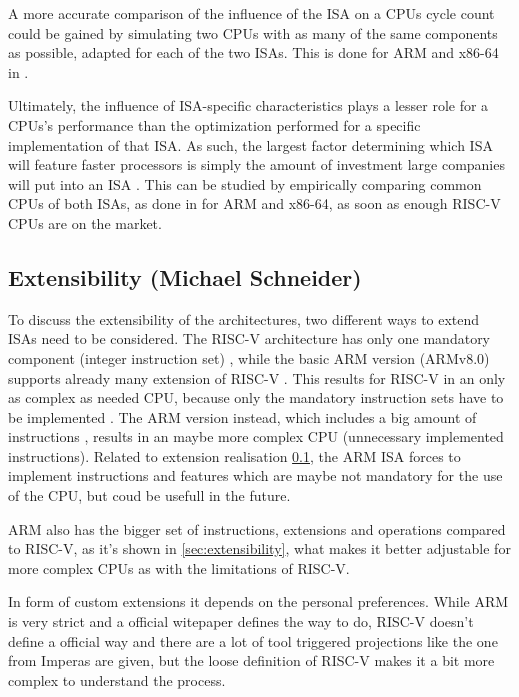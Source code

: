 \documentclass[conference]{IEEEtran}
\begin{document}
	A more accurate comparison of the influence of the \gls{ISA} on a \gls{CPU}s cycle count could be gained
	by simulating two \glspl{CPU} with as many of the same components as possible, adapted for each of the two \glspl{ISA}.
	This is done for ARM and x86-64 in \cite{Akram2017}.

	Ultimately, the influence of \gls{ISA}-specific characteristics plays a lesser role for a \glspl{CPU}'s performance
	than the optimization performed for a specific implementation of that \gls{ISA}.
	As such, the largest factor determining which \gls{ISA} will feature faster processors is simply the amount of investment
	large companies will put into an \gls{ISA} \cite{Blem2013}.
	This can be studied by empirically comparing common \glspl{CPU} of both \glspl{ISA}, as done in \cite{Blem2013} for ARM and
	x86-64, as soon as enough RISC-V \glspl{CPU} are on the market.
	
	\subsection{Extensibility (Michael Schneider)} \label{dis:Extensibility}
	To discuss the extensibility of the architectures, two different ways to extend \glspl{ISA} need to be considered. The RISC-V architecture has only one mandatory component (integer instruction set) \cite{Waterman2017}, while the basic ARM version (ARMv8.0) supports already many extension of RISC-V \cite{Arm2020}. 
	This results for RISC-V in an only as complex as needed CPU, because only the mandatory instruction sets have to be implemented \cite{Waterman2017}. The ARM version instead, which includes a big amount of instructions \cite{Arm2020}, results in an maybe more complex CPU (unnecessary implemented instructions). Related to extension realisation \ref{dis:Extensibility}, the ARM \gls{ISA} forces to implement instructions and features which are maybe not mandatory for the use of the CPU, but coud be usefull in the future. \cite{Waterman2017} \cite{Arm2020}
	
	ARM also has the bigger set of instructions, extensions and operations compared to RISC-V, as it's shown in \ref{sec:extensibility}, what makes it better adjustable for more complex CPUs as with the limitations of RISC-V.

	In form of custom extensions it depends on the personal preferences. While ARM is very strict and a official witepaper \cite{LauranneChoquin2020} defines the way to do, RISC-V doesn't define a official way and there are a lot of tool triggered projections like the one from Imperas \cite{Limited2019} are given, but the loose definition of RISC-V makes it a bit more complex to understand the process.
	
\end{document}
